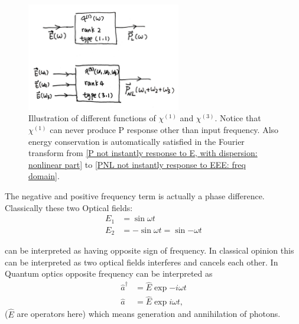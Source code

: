 \documentclass[12pt]{extarticle}
\numberwithin{equation}{section}
\numberwithin{figure}{section}
\numberwithin{table}{section}
\newcommand{\<}{\langle}
\renewcommand{\>}{\rangle}
\theoremstyle{definition}
\begin{document}
\begin{itemize}
                \begin{figure}[htbp]
                    \centering
                    \includegraphics[width=0.6\textwidth]{images/chi1_and_chi3_in_freq_domian.jpg}
                    \caption{Illustration of different functions of $\chi^{(1)}$ and $\chi^{(3)}$. Notice that $\chi^{(1)}$ can never produce P response other than input frequency. Also energy conservation is automatically satisfied in the Fourier transform from \autoref{P not instantly response to E, with dispersion: nonlinear part} to \autoref{PNL not instantly response to EEE: freq domain}.}
                    \label{fig: chi1 and chi3 freq domain illustration}
                \end{figure}
                
                The negative and positive frequency term is actually a phase difference. Classically these two Optical fields:
                \begin{subequations}
                \begin{align}
                    E_1 &= \sin{\omega t}\\
                    E_2 &= -\sin{\omega t} = \sin{-\omega t}
                \end{align}
                \end{subequations}
                
                can be interpreted as having opposite sign of frequency. In classical opinion this can be interpreted as two optical fields interferes and cancels each other. In Quantum optics opposite frequency can be interpreted as
                \begin{subequations}
                \begin{align}
                    \hat{a}^\dag &= \hat{E}\exp{-i\omega t}\\
                    \hat{a} &= \hat{E}\exp{i\omega t},
                \end{align}
                \end{subequations}
                ($\hat{E}$ are operators here) which means generation and annihilation of photons.
                

\end{itemize}
\end{document}
